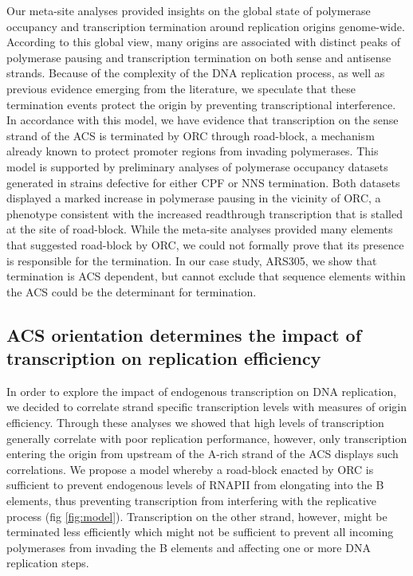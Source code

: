 Our meta-site analyses provided insights on the global state of polymerase occupancy and transcription termination around replication origins genome-wide. According to this global view, many origins are associated with distinct peaks of polymerase pausing and transcription termination on both sense and antisense strands. Because of the complexity of the DNA replication process, as well as previous evidence emerging from the literature, we speculate that these termination events protect the origin by preventing transcriptional interference. In accordance with this model, we have evidence that transcription on the sense strand of the ACS is terminated by ORC through road-block, a mechanism already known to protect promoter regions from invading polymerases. This model is supported by preliminary analyses of polymerase occupancy datasets generated in strains defective for either CPF or NNS termination. Both datasets displayed a marked increase in polymerase pausing in the vicinity of ORC, a phenotype consistent with the increased readthrough transcription that is stalled at the site of road-block. While the meta-site analyses provided many elements that suggested road-block by ORC, we could not formally prove that its presence is responsible for the termination. In our case study, ARS305, we show that termination is ACS dependent, but cannot exclude that sequence elements within the ACS could be the determinant for termination. 

\singlespacing
\subsection{ACS orientation determines the impact of transcription on replication efficiency}
\doublespacing

In order to explore the impact of endogenous transcription on DNA replication, we decided to correlate strand specific transcription levels with measures of origin efficiency. Through these analyses we showed that high levels of transcription generally correlate with poor replication performance, however, only transcription entering the origin from upstream of the A-rich strand of the ACS displays such correlations. We propose a model whereby a road-block enacted by ORC is sufficient to prevent endogenous levels of RNAPII from elongating into the B elements, thus preventing transcription from interfering with the replicative process (fig \ref{fig:model}). Transcription on the other strand, however, might be terminated less efficiently which might not be sufficient to prevent all incoming polymerases from invading the B elements and affecting one or more DNA replication steps. 

